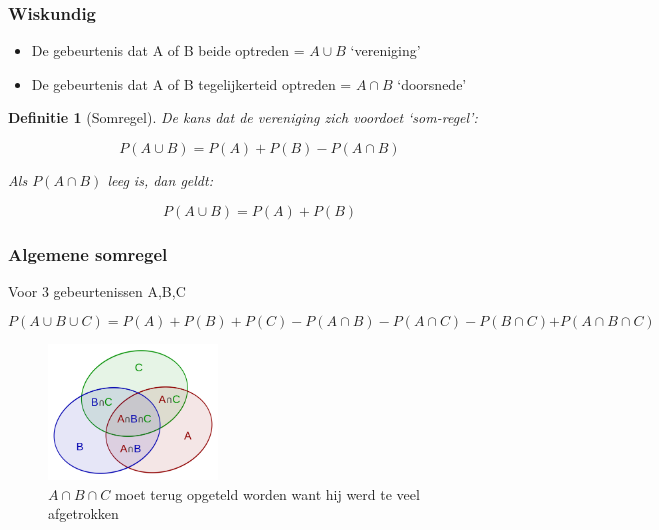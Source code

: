 \documentclass{article}
\newtheorem{theorem}{Definitie}[section]
\begin{document}
\subsubsection{Wiskundig}

\begin{itemize}
    \item De gebeurtenis dat A of B beide optreden = $A \cup B$ `vereniging'
    \item De gebeurtenis dat A of B tegelijkerteid optreden = $A \cap B$ `doorsnede'
\end{itemize}

\begin{theorem}[Somregel]
De kans dat de vereniging zich voordoet `som-regel':

\begin{equation}
    P(A \cup B) = P(A) + P(B) - P(A \cap B)
\end{equation}

Als $P(A \cap B)$ leeg is, dan geldt:

\begin{equation}
    P(A \cup B) = P(A) + P(B)
\end{equation}
\end{theorem}

\subsubsection{Algemene somregel}

Voor 3 gebeurtenissen A,B,C

\begin{equation}
    P(A \cup B \cup C) = P(A) + P(B) + P(C) - P(A \cap B) - P(A \cap C) - P(B \cap C) \mathbf{+} P(A \cap B \cap C)
\end{equation}


\begin{figure}[H]
    \centering
    \includegraphics[width=0.4\textwidth]{algemene-somregel.png}
    \caption{$A \cap B \cap C$ moet terug opgeteld worden want hij werd te veel afgetrokken}
\end{figure}
\end{document}
